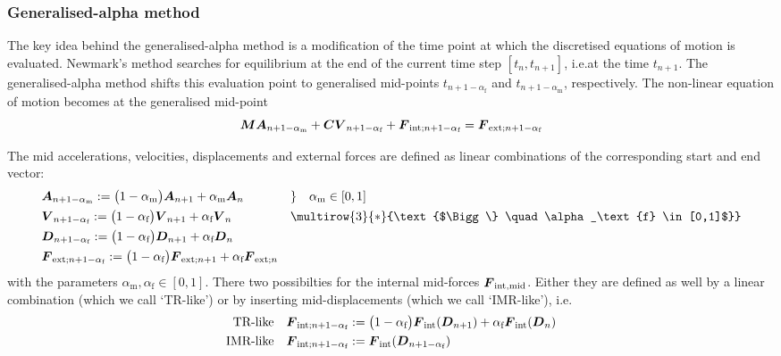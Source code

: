 \subsubsection{Generalised-alpha method}
The key idea behind the generalised-alpha method \cite{strdyn:chung95} is a modification of the
time point at
which the discretised equations of motion is evaluated. Newmark's method
searches for equilibrium at the end of the current time step $[t_n,t_{n+1}]$,
i.e.\@ at the time $t_{n+1}$. The generalised-alpha method shifts this
evaluation point to  generalised mid-points
$t_{n+1-\alpha_\text{f}}$ and $t_{n+1-\alpha_\text{m}}$, respectively. The non-linear
equation of motion becomes at the generalised mid-point\\
\begin{equation}
  \mat{M} \vct{A}_{n+1-\alpha_\text{m}}
  + \mat{C} \vct{V}_{n+1-\alpha_\text{f}}
  + \vct{F}_{\Int;n+1-\alpha_\text{f}} %
  = \vct{F}_{\Ext;n+1-\alpha_\text{f}}
\end{equation}

The mid accelerations, velocities, displacements and external forces are
defined as linear combinations of the corresponding start and end vector:\\
\begin{equation}\label{strdyn:eq:genalpha-middef}
\begin{aligned}
&   \vct{A}_{n+1-\alpha_\text{m}}
    := \big( 1- \alpha_\text{m} \big) \vct{A}_{n+1}
    + \alpha_\text{m} \vct{A}_n
&& \} \quad \alpha_\text{m} \in[0,1]
\\
&   \vct{V}_{n+1-\alpha_\text{f}}
    := \big( 1- \alpha_\text{f} \big) \vct{V}_{n+1}
    + \alpha_\text{f} \vct{V}_n
&&  \multirow{3}{*}{\text{$\Bigg\} \quad \alpha_\text{f} \in[0,1]$}}
\\
&   \vct{D}_{n+1-\alpha_\text{f}}
    := \big( 1- \alpha_\text{f} \big) \vct{D}_{n+1}
    + \alpha_\text{f} \vct{D}_n
&&
\\
&   \vct{F}_{\Ext;n+1-\alpha_\text{f}}
    := \big( 1- \alpha_\text{f} \big) \vct{F}_{\Ext;n+1}
    + \alpha_\text{f} \vct{F}_{\Ext;n}
&&
\end{aligned}
\end{equation}
with the parameters $\alpha_\text{m},\alpha_\text{f}\in[0,1]$. There two possibilties for the internal mid-forces $\boldsymbol{F}_{\text{int},\text{mid}}$. Either they are defined as well by a linear combination (which we call `TR-like') or by inserting mid-displacements (which we call `IMR-like'), i.e.
\begin{align}
  \text{TR-like} & \quad \boldsymbol{F}_{\text{int};n+1-\alpha_\text{f}}
    := \big( 1- \alpha_\text{f} \big) \boldsymbol{F}_{\text{int}}(\boldsymbol{D}_{n+1})
    + \alpha_\text{f} \boldsymbol{F}_{\text{int}}(\boldsymbol{D}_{n})
\\
  \text{IMR-like} & \quad \boldsymbol{F}_ {\text{int};n+1-\alpha_\text{f}} :=  \boldsymbol{F}_{\text{int}}(\boldsymbol{D}_{n+1-\alpha_\text{f}})
\end{align}

